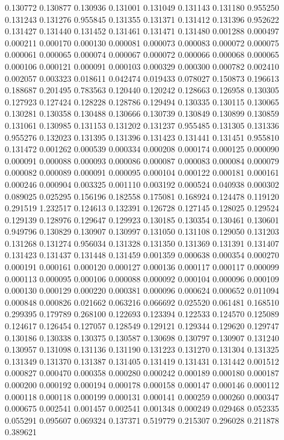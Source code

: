 0.130772
0.130877
0.130936
0.131001
0.131049
0.131143
0.131180
0.955250
0.131243
0.131276
0.955845
0.131355
0.131371
0.131412
0.131396
0.952622
0.131427
0.131440
0.131452
0.131461
0.131471
0.131480
0.001288
0.000497
0.000211
0.000170
0.000130
0.000081
0.000073
0.000083
0.000072
0.000075
0.000061
0.000065
0.000074
0.000067
0.000072
0.000066
0.000068
0.000065
0.000106
0.000121
0.000091
0.000103
0.000329
0.000300
0.000782
0.002410
0.002057
0.003323
0.018611
0.042474
0.019433
0.078027
0.150873
0.196613
0.188687
0.201495
0.783563
0.120440
0.120242
0.128663
0.126958
0.130305
0.127923
0.127424
0.128228
0.128786
0.129494
0.130335
0.130115
0.130065
0.130281
0.130358
0.130488
0.130666
0.130739
0.130849
0.130899
0.130859
0.131061
0.130985
0.131153
0.131202
0.131237
0.955485
0.131305
0.131336
0.955276
0.132023
0.131395
0.131396
0.131423
0.131441
0.131451
0.955810
0.131472
0.001262
0.000539
0.000334
0.000208
0.000174
0.000125
0.000090
0.000091
0.000088
0.000093
0.000086
0.000087
0.000083
0.000084
0.000079
0.000082
0.000089
0.000091
0.000095
0.000104
0.000122
0.000181
0.000161
0.000246
0.000904
0.003325
0.001110
0.003192
0.000524
0.040938
0.000302
0.089025
0.025295
0.156196
0.182558
0.175081
0.168924
0.124478
0.119120
0.291519
1.232517
0.124613
0.132391
0.126728
0.127145
0.128025
0.129524
0.129139
0.128976
0.129647
0.129923
0.130185
0.130354
0.130461
0.130601
0.949796
0.130829
0.130907
0.130997
0.131050
0.131108
0.129050
0.131203
0.131268
0.131274
0.956034
0.131328
0.131350
0.131369
0.131391
0.131407
0.131423
0.131437
0.131448
0.131459
0.001359
0.000638
0.000354
0.000270
0.000191
0.000161
0.000120
0.000127
0.000136
0.000117
0.000117
0.000099
0.000113
0.000095
0.000106
0.000088
0.000092
0.000104
0.000096
0.000109
0.000130
0.000129
0.000220
0.000381
0.000096
0.000624
0.000652
0.011094
0.000848
0.000826
0.021662
0.063216
0.066692
0.025520
0.061481
0.168510
0.299395
0.179789
0.268100
0.122693
0.123394
0.122533
0.124570
0.125089
0.124617
0.126454
0.127057
0.128549
0.129121
0.129344
0.129620
0.129747
0.130186
0.130338
0.130375
0.130587
0.130698
0.130797
0.130907
0.131240
0.130957
0.131098
0.131136
0.131190
0.131223
0.131270
0.131304
0.131325
0.131349
0.131370
0.131387
0.131405
0.131419
0.131431
0.131442
0.001512
0.000827
0.000470
0.000358
0.000280
0.000242
0.000189
0.000180
0.000187
0.000200
0.000192
0.000194
0.000178
0.000158
0.000147
0.000146
0.000112
0.000118
0.000118
0.000199
0.000131
0.000141
0.000259
0.000260
0.000347
0.000675
0.002541
0.001457
0.002541
0.001348
0.000249
0.029468
0.052335
0.055291
0.095607
0.069324
0.137371
0.519779
0.215307
0.296028
0.211878
0.389621
